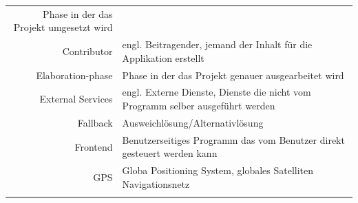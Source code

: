 \documentclass[a4paper,10pt,xetex]{article}
\begin{document}
\begin{longtable}[]{@{}rl@{}}
\begin{minipage}[t]{0.76\columnwidth}
Phase in der das Projekt umgesetzt wird\strut
\end{minipage}\tabularnewline
\begin{minipage}[t]{0.18\columnwidth}\raggedleft\strut
Contributor\strut
\end{minipage} & \begin{minipage}[t]{0.76\columnwidth}\raggedright\strut
engl. Beitragender, jemand der Inhalt für die Applikation erstellt\strut
\end{minipage}\tabularnewline
\begin{minipage}[t]{0.18\columnwidth}\raggedleft\strut
Elaboration-phase\strut
\end{minipage} & \begin{minipage}[t]{0.76\columnwidth}\raggedright\strut
Phase in der das Projekt genauer ausgearbeitet wird\strut
\end{minipage}\tabularnewline
\begin{minipage}[t]{0.18\columnwidth}\raggedleft\strut
External Services\strut
\end{minipage} & \begin{minipage}[t]{0.76\columnwidth}\raggedright\strut
engl. Externe Dienste, Dienste die nicht vom Programm selber ausgeführt
werden\strut
\end{minipage}\tabularnewline
\begin{minipage}[t]{0.18\columnwidth}\raggedleft\strut
Fallback\strut
\end{minipage} & \begin{minipage}[t]{0.76\columnwidth}\raggedright\strut
Ausweichlösung/Alternativlösung\strut
\end{minipage}\tabularnewline
\begin{minipage}[t]{0.18\columnwidth}\raggedleft\strut
Frontend\strut
\end{minipage} & \begin{minipage}[t]{0.76\columnwidth}\raggedright\strut
Benutzerseitiges Programm das vom Benutzer direkt gesteuert werden
kann\strut
\end{minipage}\tabularnewline
\begin{minipage}[t]{0.18\columnwidth}\raggedleft\strut
GPS\strut
\end{minipage} & \begin{minipage}[t]{0.76\columnwidth}\raggedright\strut
Globa Positioning System, globales Satelliten Navigationsnetz\strut
\end{minipage}\tabularnewline
\begin{minipage}[t]{0.18\columnwidth}\raggedleft\strut

\end{minipage}
\end{longtable}
\end{document}
